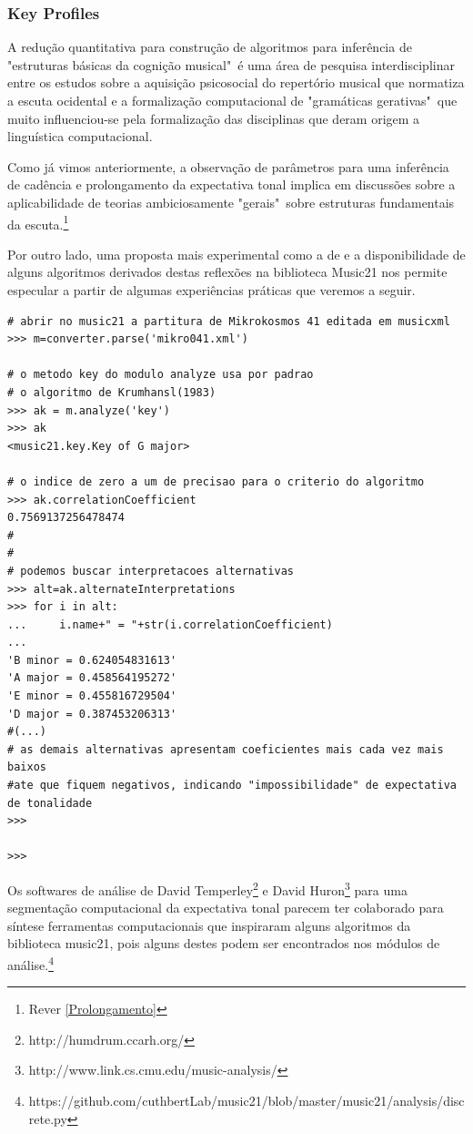\documentclass[
	12pt,				%
	openright,			%
	twoside,			%
	a4paper,			%
	english,			%
	french,				%
	spanish,			%
	brazil				%
	]{abntex2}
\begin{document}
\subsubsection{Key Profiles} 

A redução quantitativa para construção de algoritmos para inferência de "estruturas básicas da cognição musical"\cite{temperley2001cognition}\ é uma área de pesquisa interdisciplinar entre os estudos sobre a aquisição psicosocial do repertório musical que normatiza a escuta ocidental e a formalização computacional de "gramáticas gerativas"\cite[p. 83]{nierhaus2009algorithmic}\ que muito influenciou-se pela formalização das disciplinas que deram origem a linguística computacional.\cite{roads1979grammars}    

Como já vimos anteriormente, a observação de parâmetros para uma inferência de cadência e prolongamento da expectativa tonal implica em discussões sobre a aplicabilidade de teorias ambiciosamente "gerais"\ sobre estruturas fundamentais da escuta.\footnote{Rever \autoref{Prolongamento}  }

Por outro lado, uma proposta mais experimental como a de  e a disponibilidade de alguns algoritmos derivados destas reflexões na biblioteca Music21 nos permite especular a partir de algumas experiências práticas que veremos a seguir.


\begin{lstlisting}
# abrir no music21 a partitura de Mikrokosmos 41 editada em musicxml
>>> m=converter.parse('mikro041.xml')

# o metodo key do modulo analyze usa por padrao
# o algoritmo de Krumhansl(1983)
>>> ak = m.analyze('key')
>>> ak
<music21.key.Key of G major>

# o indice de zero a um de precisao para o criterio do algoritmo
>>> ak.correlationCoefficient
0.7569137256478474
#
#
# podemos buscar interpretacoes alternativas
>>> alt=ak.alternateInterpretations
>>> for i in alt:
...     i.name+" = "+str(i.correlationCoefficient)
... 
'B minor = 0.624054831613'
'A major = 0.458564195272'
'E minor = 0.455816729504'
'D major = 0.387453206313'
#(...)
# as demais alternativas apresentam coeficientes mais cada vez mais baixos 
#ate que fiquem negativos, indicando "impossibilidade" de expectativa de tonalidade
>>> 

>>> 
\end{lstlisting}

Os softwares de análise de David Temperley\footnote{http://humdrum.ccarh.org/} e David Huron\footnote{http://www.link.cs.cmu.edu/music-analysis/}  para uma segmentação computacional da expectativa tonal parecem ter colaborado para síntese ferramentas computacionais que inspiraram alguns algoritmos da biblioteca music21, pois alguns destes podem ser encontrados nos módulos de análise.\footnote{https://github.com/cuthbertLab/music21/blob/master/music21/analysis/discrete.py}
\end{document}
